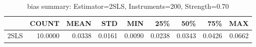 \begin{table}[ht]
\centering
\caption{bias summary: Estimator=2SLS, Instruments=200, Strength=0.70}
\begin{tabular}{lrrrrrrrr}
\toprule
 & COUNT & MEAN & STD & MIN & 25\% & 50\% & 75\% & MAX \\
\midrule
2SLS & 10.0000 & 0.0338 & 0.0161 & 0.0090 & 0.0238 & 0.0343 & 0.0426 & 0.0662 \\
\bottomrule
\end{tabular}
\end{table}
